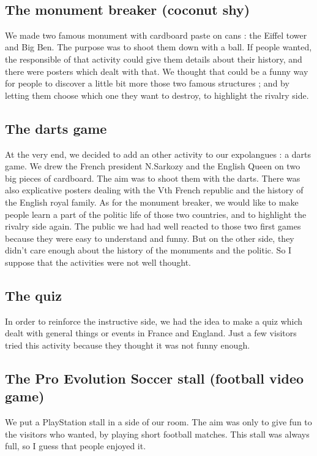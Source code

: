 \documentclass[11pt;a4paper]{report}
\begin{document}
~

    \subsection{The monument breaker (coconut shy)}
We made two famous monument with cardboard paste on cans : the Eiffel tower and Big Ben. The  purpose was to shoot them down with a ball. If people wanted, the responsible of that activity could give them details about their history, and there were posters which dealt with that. 
We thought that could be a funny way for people to discover a little bit more those two famous structures ; and by letting them choose which one they want to destroy, to highlight the rivalry side.

    \subsection{The darts game}
At the very end, we decided to add an other activity to our expolangues : a darts game. We drew the French president N.Sarkozy and the English Queen on two big pieces of cardboard. The aim was to shoot them with the darts. There was also explicative posters dealing with the Vth French republic and the history of the English royal family. As for the monument breaker, we would like to make people learn a part of the politic life of those two countries, and to highlight the rivalry side again.
The public we had had well reacted to those two first games because they were easy to understand and funny. But on the other side, they didn't care enough about the history of the monuments and the politic. 
So I suppose that the activities were not well thought.

    \subsection{The quiz}
In order to reinforce the instructive side, we had the idea to make a quiz which dealt with general things or events in France and England.
Just a few visitors tried this activity because they thought it was not funny enough.

    \subsection{The Pro Evolution Soccer stall (football video game)}
We put a PlayStation stall in a side of our room. The aim was only to give fun to the visitors who wanted, by playing short football matches. This stall was always full, so I guess that people enjoyed it.
\end{document}
